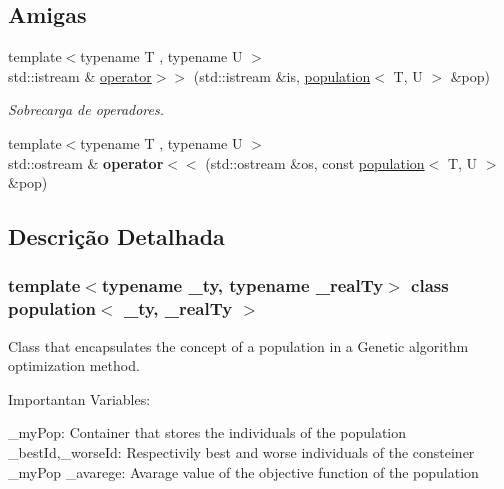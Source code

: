 \subsection*{Amigas}
\begin{DoxyCompactItemize}
\item 
\hypertarget{classpopulation_aa6fb88900759771dccfd85d21785fd1b}{
{\footnotesize template$<$typename T , typename U $>$ }\\std::istream \& \hyperlink{classpopulation_aa6fb88900759771dccfd85d21785fd1b}{operator$>$$>$} (std::istream \&is, \hyperlink{classpopulation}{population}$<$ T, U $>$ \&pop)}
\label{classpopulation_aa6fb88900759771dccfd85d21785fd1b}

\begin{DoxyCompactList}\small\item\em Sobrecarga de operadores. \item\end{DoxyCompactList}\item 
\hypertarget{classpopulation_ab134fdc6db277abea408d9dfb410e725}{
{\footnotesize template$<$typename T , typename U $>$ }\\std::ostream \& {\bfseries operator$<$$<$} (std::ostream \&os, const \hyperlink{classpopulation}{population}$<$ T, U $>$ \&pop)}
\label{classpopulation_ab134fdc6db277abea408d9dfb410e725}

\end{DoxyCompactItemize}


\subsection{Descrição Detalhada}
\subsubsection*{template$<$typename \_\-ty, typename \_\-realTy$>$ class population$<$ \_\-ty, \_\-realTy $>$}

Class that encapsulates the concept of a population in a Genetic algorithm optimization method.

Importantan Variables:

\_\-myPop: Container that stores the individuals of the population \_\-bestId,\_\-worseId: Respectivily best and worse individuals of the consteiner \_\-myPop \_\-avarege: Avarage value of the objective function of the population 

